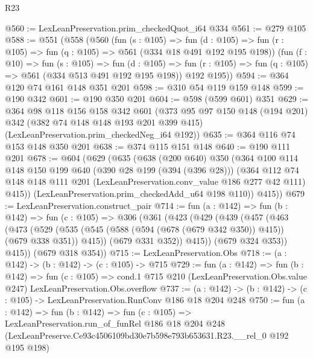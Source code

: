 \begin{lexlean}{R23}
\begin{coremodule}
@560 := LexLeanPreservation.prim_checkedQuot_i64 @334
@561 := @279 @105
@588 := @551
    (@558
      (@560
        (fun (s : @105) =>
        fun (d : @105) => fun (r : @105) => fun (q : @105) => @561 (@334 @18 @491 @192 @195 @198))
        (fun (f : @10) =>
        fun (s : @105) =>
        fun (d : @105) => fun (r : @105) => fun (q : @105) => @561 (@334 @513 @491 @192 @195 @198))
        @192
        @195))
@594 := @364 @120 @74 @161 @148 @351 @201
@598 := @310 @54 @119 @159 @148
@599 := @190 @342
@601 := @190 @350 @201
@604 := @598 (@599 @601) @351
@629 := @364
    @98
    @118
    @156
    @158
    @342
    @601
    (@373
      @95
      @97
      @150
      @148
      (@194 @201)
      @342
      (@382 @74 @148 @148 @193 @201 @399 @415)
      (LexLeanPreservation.prim_checkedNeg_i64 @192))
@635 := @364 @116 @74 @153 @148 @350 @201
@638 := @374 @115 @151 @148
@640 := @190 @111 @201
@678 := @604
    (@629
      (@635
        (@638
          (@200 @640)
          @350
          (@364
            @100
            @114
            @148
            @150
            @199
            @640
            (@390 @28 @199 (@394 (@396 @28)))
            (@364
              @112
              @74
              @148
              @148
              @111
              @201
              (LexLeanPreservation.conv_value @186 @277 @42 @111)
              @415))
          (LexLeanPreservation.prim_checkedAdd_u64 @198 @110))
        @415))
@679 := LexLeanPreservation.construct_pair
@714 := fun (a : @142) =>
  fun (b : @142) =>
  fun (c : @105) =>
  @306
    (@361
      (@423
        (@429
          (@439
            (@457
              (@463
                (@473
                  (@529
                    (@535 (@545 (@588 (@594 (@678 (@679 @342 @350)) @415)) (@679 @338 @351)) @415))
                  (@679 @331 @352))
                @415))
            (@679 @324 @353))
          @415))
      (@679 @318 @354))
@715 := LexLeanPreservation.Obs
@718 := (a : @142) -> (b : @142) -> (c : @105) -> @715
@729 := fun (a : @142) =>
  fun (b : @142) =>
  fun (c : @105) =>
  cond.{1} @715 @210 (LexLeanPreservation.Obs.value @247) LexLeanPreservation.Obs.overflow
@737 := (a : @142) -> (b : @142) -> (c : @105) -> LexLeanPreservation.RunConv @186 @18 @204 @248
@750 := fun (a : @142) =>
  fun (b : @142) =>
  fun (c : @105) =>
  LexLeanPreservation.run_of_funRel
    @186
    @18
    @204
    @248
    (LexLeanPreserve.Ce93c4506109bd30e7b598e793b653631.R23.__rel_0 @192 @195 @198)
\end{coremodule}
\end{lexlean}

